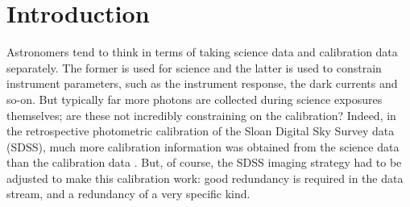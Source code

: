 \documentclass[manuscript]{aastex}
\begin{document}




\section{Introduction}
Astronomers tend to think in terms of taking science data and calibration data separately. The former is used for science and the latter is used to constrain instrument parameters, such as the instrument response, the dark currents and so-on. But typically far more photons are collected during science exposures themselves; are these not incredibly constraining on the calibration? Indeed, in the retrospective photometric calibration of the Sloan Digital Sky Survey data (SDSS), much more calibration information was obtained from the science data than the calibration data \citep{pad08}. But, of course, the SDSS imaging strategy had to be adjusted to make this calibration work: good redundancy is required in the data stream, and a redundancy of a very specific kind.
\end{document}
